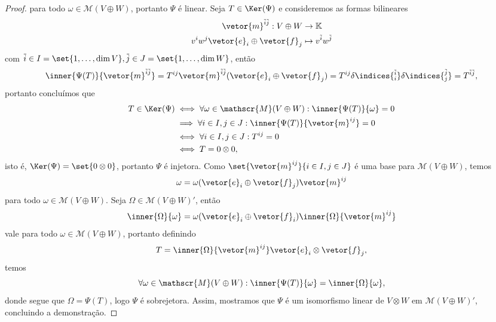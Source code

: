 \begin{proof}
    para todo \(\omega \in \mathscr{M}(V\oplus W)\), portanto \(\Psi\) é linear. Seja \(T \in \Ker(\Psi)\) e consideremos as formas bilineares
    \begin{align*}
        \vetor{m}^{\tilde{i}\tilde{j}} : V \oplus W &\to \mathbb{K}\\
        v^iw^j \vetor{e}_i \oplus \vetor{f}_j &\mapsto v^{\tilde{i}} w^{\tilde{j}}
    \end{align*}
    com \(\tilde{i} \in I = \set{1, \dots, \dim V}, \tilde{j} \in J = \set{1, \dots, \dim W}\), então
    \begin{equation*}
        \inner{\Psi(T)}{\vetor{m}^{\tilde{i}\tilde{j}}} = T^{ij} \vetor{m}^{\tilde{i}\tilde{j}}(\vetor{e}_i\oplus \vetor{f}_j) = T^{ij} \delta\indices{^{\tilde{i}}_{i}}\delta\indices{^{\tilde{j}}_{j}} = T^{\tilde{i}\tilde{j}},
    \end{equation*}
    portanto concluímos que
    \begin{align*}
        T \in \Ker(\Psi) &\iff \forall \omega \in \mathscr{M}(V \oplus W): \inner{\Psi(T)}{\omega} = 0\\
                         &\implies \forall i \in I, j \in J : \inner{\Psi(T)}{\vetor{m}^{ij}} = 0\\
                         &\iff \forall i \in I, j \in J: T^{ij} = 0\\
                         &\iff T = 0 \otimes 0,
    \end{align*}
    isto é, \(\Ker(\Psi) = \set{0\otimes 0}\), portanto \(\Psi\) é injetora. Como \(\set{\vetor{m}^{ij}}{i \in I, j \in J}\) é uma base para \(\mathscr{M}(V \oplus W)\), temos
    \begin{equation*}
        \omega = \omega(\vetor{e}_i\oplus \vetor{f}_j) \vetor{m}^{ij}
    \end{equation*}
    para todo \(\omega \in \mathscr{M}(V \oplus W)\). Seja \(\Omega \in \mathscr{M}(V \oplus W)'\), então
    \begin{equation*}
        \inner{\Omega}{\omega} = \omega(\vetor{e}_i \oplus \vetor{f}_i) \inner{\Omega}{\vetor{m}^{ij}}
    \end{equation*}
    vale para todo \(\omega\in \mathscr{M}(V \oplus W)\), portanto definindo
    \begin{equation*}
        T = \inner{\Omega}{\vetor{m}^{ij}} \vetor{e}_i \otimes \vetor{f}_j,
    \end{equation*}
    temos
    \begin{equation*}
        \forall \omega \in \mathscr{M}(V\oplus W) : \inner{\Psi(T)}{\omega} = \inner{\Omega}{\omega},
    \end{equation*}
    donde segue que \(\Omega = \Psi(T)\), logo \(\Psi\) é sobrejetora. Assim, mostramos que \(\Psi\) é um isomorfismo linear de \(V \otimes W\) em \(\mathscr{M}(V \oplus W)'\), concluindo a demonstração.
\end{proof}

